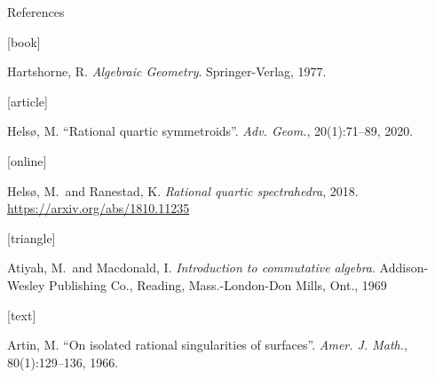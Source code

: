 \documentclass[UKenglish]{beamer}
\begin{document}
\begin{frame}[allowframebreaks]{References}
    \begin{thebibliography}{}

        [book]

        Hartshorne, R.
        \newblock \emph{Algebraic Geometry}.
        \newblock Springer-Verlag, 1977.

        [article]

        Helsø, M.
        \newblock \enquote{Rational quartic symmetroids}.
        \newblock \emph{Adv. Geom.}, 20(1):71--89, 2020.

        [online]

        Helsø, M.\ and Ranestad, K.
        \newblock \emph{Rational quartic spectrahedra}, 2018.
        \newblock \url{https://arxiv.org/abs/1810.11235}

        [triangle]

        Atiyah, M.\ and Macdonald, I.
        \newblock \emph{Introduction to commutative algebra}.
        \newblock Addison-Wesley Publishing Co., Reading, Mass.-London-Don
        Mills, Ont., 1969

        [text]

        Artin, M.
        \newblock \enquote{On isolated rational singularities of surfaces}.
        \newblock \emph{Amer. J. Math.}, 80(1):129--136, 1966.

    \end{thebibliography}
\end{frame}
\end{document}
